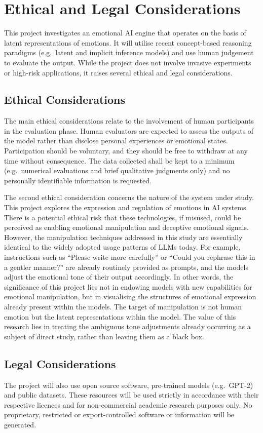 \chapter{Ethical and Legal Considerations}

This project investigates an emotional AI engine that operates on the basis of latent representations of emotions. It will utilise recent concept-based reasoning paradigms (e.g.\ latent and implicit inference models) and use human judgement to evaluate the output. While the project does not involve invasive experiments or high-risk applications, it raises several ethical and legal considerations.

\section{Ethical Considerations}
The main ethical considerations relate to the involvement of human participants in the evaluation phase. Human evaluators are expected to assess the outputs of the model rather than disclose personal experiences or emotional states. Participation should be voluntary, and they should be free to withdraw at any time without consequence. The data collected shall be kept to a minimum (e.g.\ numerical evaluations and brief qualitative judgments only) and no personally identifiable information is requested.

The second ethical consideration concerns the nature of the system under study. This project explores the expression and regulation of emotions in AI systems. There is a potential ethical risk that these technologies, if misused, could be perceived as enabling emotional manipulation and deceptive emotional signals. However, the manipulation techniques addressed in this study are essentially identical to the widely adopted usage patterns of LLMs today. For example, instructions such as ``Please write more carefully'' or ``Could you rephrase this in a gentler manner?'' are already routinely provided as prompts, and the models adjust the emotional tone of their output accordingly. In other words, the significance of this project lies not in endowing models with new capabilities for emotional manipulation, but in visualising the structures of emotional expression already present within the models. The target of manipulation is not human emotion but the latent representations within the model. The value of this research lies in treating the ambiguous tone adjustments already occurring as a subject of direct study, rather than leaving them as a black box.

\section{Legal Considerations}

The project will also use open source software, pre-trained models (e.g.\ GPT-2) and public datasets. These resources will be used strictly in accordance with their respective licences and for non-commercial academic research purposes only. No proprietary, restricted or export-controlled software or information will be generated.